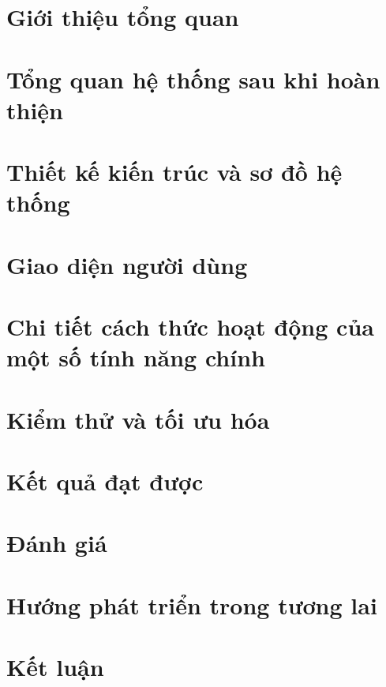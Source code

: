 \documentclass[12pt,a4paper]{report}
\theoremstyle{definition}
\begin{document}
\begin{singlespace}
	\listoffigures
\end{singlespace}
\newpage

\begin{singlespace}
	\listoftables
\end{singlespace}
\newpage
\chapter{Giới thiệu tổng quan}

\chapter{Tổng quan hệ thống sau khi hoàn thiện}

\chapter{Thiết kế kiến trúc và sơ đồ hệ thống}

\chapter{Giao diện người dùng}

% 
% 
\chapter{Chi tiết cách thức hoạt động của một số tính năng chính}

\chapter{Kiểm thử và tối ưu hóa}

\chapter{Kết quả đạt được}

\chapter{Đánh giá}

\chapter{Hướng phát triển trong tương lai}

\chapter{Kết luận}


% 
% 
% 
% 
% 
\end{document}
